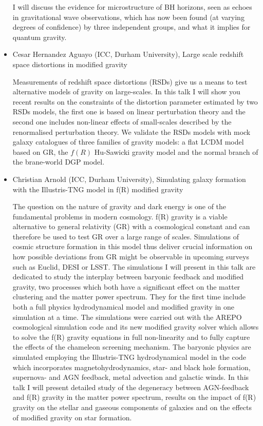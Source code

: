 \documentclass[letterpaper,12pt]{article}
\newcommand{\talk}[2]{{\fontspec{Lato Bold} #1,} {\fontspec{Lato Italic} #2}}
\begin{document}
\begin{itemize}
I will discuss the evidence for microstructure of BH horizons, seen as echoes in gravitational wave observations, which has now been found (at varying degrees of confidence) by three independent groups, and what it implies for quantum gravity.


\item \talk{Cesar Hernandez Aguayo (ICC, Durham University)}{Large scale redshift space distortions in modified gravity}

Measurements of redshift space distortions (RSDs) give us a means to test alternative models of gravity on large-scales. In this talk I will show you recent results on the constraints of the distortion parameter estimated by two RSDs models, the first one is based on linear perturbation theory and the second one includes non-linear effects of small-scales described by the renormalised perturbation theory. We validate the RSDs models with mock galaxy catalogues of three families of gravity models: a flat LCDM model based on GR, the $f(R)$ Hu-Sawicki gravity model and the normal branch of the brane-world DGP model. 


\item \talk{Christian Arnold (ICC, Durham University)}{Simulating galaxy formation with the Illustris-TNG model in f(R) modified gravity}

The question on the nature of gravity and dark energy is one of the fundamental problems in modern cosmology. f(R) gravity is a viable alternative to general relativity (GR) with a cosmological constant and can therefore be used to test GR over a large range of scales. Simulations of cosmic structure formation in this model thus deliver crucial information on how possible deviations from GR might be observable in upcoming surveys such as Euclid, DESI or LSST. The simulations I will present in this talk are dedicated to study the interplay between baryonic feedback and modified gravity, two processes which both have a significant effect on the matter clustering and the matter power spectrum. They for the first time include both a full physics hydrodynamical model and modified gravity in one simulation at a time. The simulations were carried out with the AREPO cosmological simulation code and its new modified gravity solver which allows to solve the f(R) gravity equations in full non-linearity and to fully capture the effects of the chameleon screening mechanism. The baryonic physics are simulated employing the Illustris-TNG hydrodynamical model in the code which incorporates magnetohydrodynamics, star- and black hole formation, supernova- and AGN feedback, metal advection and galactic winds. In this talk I will present detailed study of the degeneracy between AGN-feedback and f(R) gravity in the matter power spectrum, results on the impact of f(R) gravity on the stellar and gaseous components of galaxies and on the effects of modified gravity on star formation.



\end{itemize}
\end{document}
